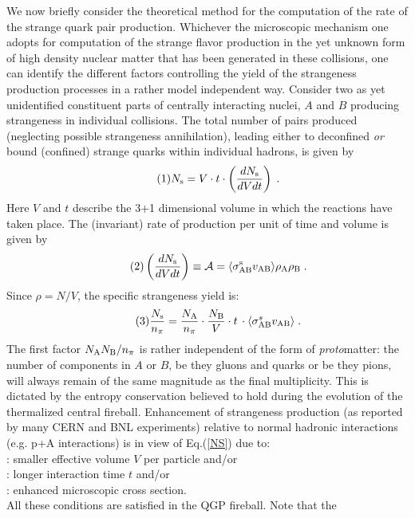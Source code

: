 \begin{mdframed}[linecolor=gray,roundcorner=12pt,backgroundcolor=Dandelion!15,linewidth=1pt,leftmargin=0cm,rightmargin=0cm,topline=true,bottomline=true,skipabove=12pt]
We now briefly consider the theoretical method for the computation of the
rate of the strange quark pair production. Whichever the microscopic
mechanism one adopts for computation of the strange flavor production in
the yet unknown form of high density nuclear matter that has been
generated in these collisions, one can identify the different factors
controlling the yield of the strangeness production processes in a rather
model independent way. Consider two as yet unidentified constituent parts
of centrally interacting nuclei, $A$ and $B$ producing strangeness in
individual collisions. The total number of pairs produced (neglecting
possible strangeness annihilation), leading either to deconfined {\it or}
bound (confined) strange quarks within individual hadrons, is given by
\begin{align*}\tag{1}
N_{\rm s}= V\cdot t\cdot \left(\frac{dN_{\rm s}}{dVdt}\right)\;.
\end{align*}
Here $V$ and $t$ describe the 3+1 dimensional volume in which the
reactions have taken place. The (invariant) rate of production per unit
of time and volume is given by
\begin{align*}\tag{2}
\left(\frac{dN_{\rm s}}{dVdt}\right)\equiv {\cal A}=
\langle\sigma^{\rm s}_{\rm AB}v_{\rm AB} \rangle 
\rho_{\rm A}\rho_{\rm B}\;. \label{Arateis}
\end{align*}
Since  $\rho=N/V$, the specific strangeness yield is:
\begin{align*}\tag{3}
\frac{N_{\rm s}}{n_\pi}=\frac{N_{\rm A}}{n_\pi}\cdot 
\frac{N_{\rm B}}{V} \cdot t\, \cdot 
\langle \sigma^s_{\rm AB} v_{\rm AB}\rangle\;. 
\label{NS}
\end{align*}
The first factor $N_{\rm A}N_{\rm B}/n_\pi$ is rather independent of the
form of {\it proto}matter: the number of components in $A$ or $B$, be
they gluons and quarks or be they pions, will always remain of the same
magnitude as the final multiplicity. This is dictated by the entropy
conservation believed to hold during the evolution of the thermalized
central fireball. Enhancement of strangeness production (as reported by
many CERN and BNL experiments) relative to normal hadronic interactions
(e.g. p+A interactions) is in view of Eq.(\ref{NS}) due to:\\
: smaller effective volume $V$ per particle and/or\\
: longer interaction time $t$ and/or\\
: enhanced microscopic cross section.\\
All these conditions are satisfied in the QGP fireball. Note that the

\end{mdframed}
